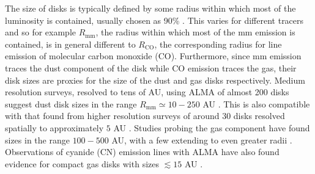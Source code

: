 
The size of disks is typically defined by some radius within which most of the luminosity is contained, usually chosen as 90\% \citep[eg.][]{andrews2018a}. 
This varies for different tracers and so for example $R_\mathrm{mm}$, the radius within which most of the mm emission is contained, is in general different to $R_\mathrm{CO}$, the corresponding radius for line emission of molecular carbon monoxide (CO). 
Furthermore, since mm emission traces the dust component of the disk while CO emission traces the gas, their disk sizes are proxies for the size of the dust and gas disks respectively.
Medium resolution surveys, resolved to tens of AU, using ALMA of almost 200 disks suggest dust disk sizes in the range $R_\mathrm{mm} \simeq 10 - 250$ AU \citep{tripathi2017,andrews2018a,hendler2020}. 
This is also compatible with that found from higher resolution surveys of around 30 disks resolved spatially to approximately $5$ AU \citep{long2018,huang2018b}.
Studies probing the gas component have found sizes in the range $100-500$ AU, with a few extending to even greater radii \citep{ansdell2018,zhang2021}. 
Observations of cyanide (CN) emission lines with ALMA have also found evidence for compact gas disks with sizes $\lesssim 15$ AU \citep{vanterwisga2019}.

